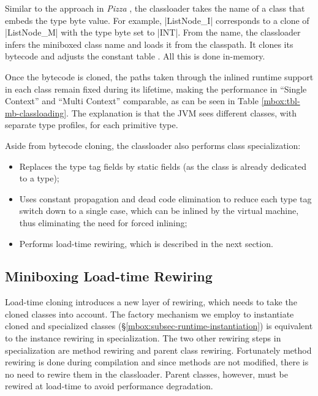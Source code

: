  Similar to the approach in {\em Pizza} \cite{pizza}, the classloader takes the name of a class that embeds the type byte value. For example, |ListNode_I| corresponds to a clone of |ListNode_M| with the type byte set to |INT|. From the name, the classloader infers the miniboxed class name and loads it from the classpath. It clones its bytecode and adjusts the constant table \cite{jsr-202}. All this is done in-memory.

Once the bytecode is cloned, the paths taken through the inlined runtime support in each class remain fixed during its lifetime, making the performance in ``Single Context'' and ``Multi Context'' comparable, as can be seen in Table \ref{mbox:tbl-mb-classloading}. The explanation is that the JVM sees different classes, with separate type profiles, for each primitive type.

Aside from bytecode cloning, the classloader also performs class specialization:
\begin{itemize}
\item Replaces the type tag fields by static fields (as the class is already dedicated to a type);
\item Uses constant propagation and dead code elimination to reduce each type tag switch down to a single case, which can be inlined by the virtual machine, thus eliminating the need for forced inlining;
\item Performs load-time rewiring, which is described in the next section.
\end{itemize}

\subsection{Miniboxing Load-time Rewiring}
\label{mbox:subsec-runtime-rewiring}

 Load-time cloning introduces a new layer of rewiring, which needs to take the cloned classes into account. The factory mechanism we employ to instantiate cloned and specialized classes (\S\ref{mbox:subsec-runtime-instantiation}) is equivalent to the instance rewiring in specialization. The two other rewiring steps in specialization are method rewiring and parent class rewiring. Fortunately method rewiring is done during compilation and since methods are not modified, there is no need to rewire them in the classloader. Parent classes, however, must be rewired at load-time to avoid performance degradation.

